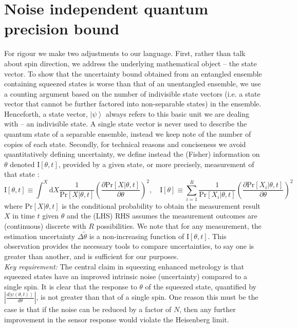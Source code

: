 \documentclass[reqno]{amsart}
\def\be{\begin{equation}}
\def\ee{\end{equation}}
\def\est#1{\tilde{#1}}
\newcommand{\ket}[1]{\left| #1 \right>}
\def\func#1#2{\mathrm{#1}\left[#2\right]}
\begin{document}
\section*{Noise independent quantum precision bound}%
For rigour we make two adjustments to our language. First, rather than talk about spin direction, we address the underlying mathematical object -- the state vector. To show that the uncertainty bound obtained from an entangled ensemble containing squeezed states is worse than that of an unentangled ensemble, we use a counting argument based on the number of indivisible state vectors (i.e. a state vector that cannot be further factored into non-separable states) in the ensemble. Henceforth, a state vector, $\ket{\psi}$ always refers to this basic unit we are dealing with -- an indivisible state. A single state vector is never used to describe the quantum state of a separable ensemble, instead we keep note of the number of copies of each state. Secondly, for technical reasons and conciseness we avoid quantitatively defining uncertainty, we define instead the (Fisher) information on $\theta$ denoted $\func{I}{\theta,t}$, provided by a given state, or more precisely, measurement of that state \cite{Braunstein1994}:
\be
\func{I}{\theta,t} \equiv \int^{X} \mathrm{d}X \frac{1}{\func{Pr}{X|\theta,t}}\left(\frac{\partial \func{Pr}{X|\theta,t}}{\partial \theta}\right)^2, \quad \func{I}{\theta} \equiv \sum_{i=1}^R \frac{1}{\func{Pr}{X_i|\theta,t}}\left(\frac{\partial \func{Pr}{X_i|\theta,t}}{\partial \theta}\right)^2
\label{eq:QFI}
\ee
where $\func{Pr}{X|\theta,t}$ is the conditional probability to obtain the measurement result $X$ in time $t$ given $\theta$ and the (LHS) RHS assumes the measurement outcomes are (continuous) discrete with $R$ possibilities. We note that for any measurement, the estimation uncertainty $\Delta \est{\theta}$ is a non-increasing function of $\func{I}{\theta,t}$. This observation provides the necessary tools to compare uncertainties, to say one is greater than another, and is sufficient for our purposes.\\

\emph{Key requirement:} The central claim in squeezing enhanced metrology is that squeezed states have an improved intrinsic noise (uncertainty) compared to a single spin. It is clear that the response to $\theta$ of the squeezed state, quantified by $\left|\frac{d\ket{\psi(\theta,t)}}{d \theta}\right|$, is not greater than that of a single spin. One reason this must be the case is that if the noise can be reduced by a factor of $N$, then any further improvement in the sensor response would violate the Heisenberg limit.\\%
\end{document}
